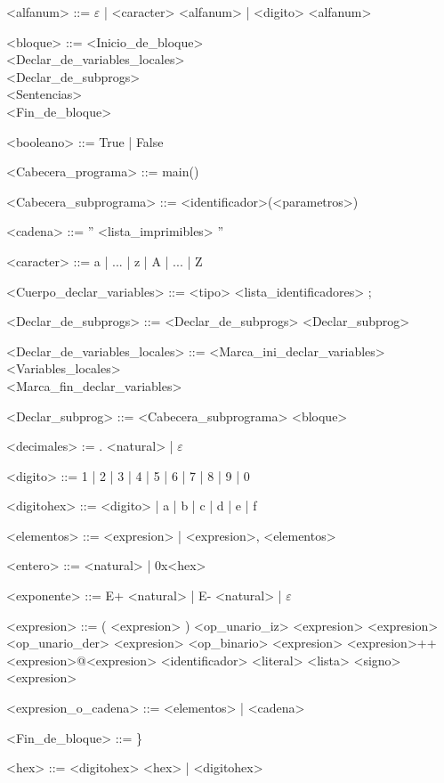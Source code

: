 \setlength{\grammarparsep}{4pt plus 1pt minus 1pt}

\begin{grammar}

<alfanum> ::= $\varepsilon$ | <caracter> <alfanum> | <digito> <alfanum>

<bloque> ::= <Inicio_de_bloque> \\
 <Declar_de_variables_locales> \\
 <Declar_de_subprogs> \\
 <Sentencias> \\
 <Fin_de_bloque>

<booleano> ::= True | False

<Cabecera_programa> ::= main()

<Cabecera_subprograma> ::= <identificador>(<parametros>)

<cadena> ::= '' <lista_imprimibles> ''

<caracter> ::= a | ... | z | A | ... | Z

<Cuerpo_declar_variables> ::= <tipo> <lista_identificadores> ;

<Declar_de_subprogs> ::= <Declar_de_subprogs> <Declar_subprog>

<Declar_de_variables_locales> ::= <Marca_ini_declar_variables> \\
<Variables_locales> \\
<Marca_fin_declar_variables>

<Declar_subprog> ::= <Cabecera_subprograma> <bloque>

<decimales> := . <natural> | $\varepsilon$

<digito> ::= 1 | 2 | 3 | 4 | 5 | 6 | 7 | 8 | 9 | 0

<digitohex> ::= <digito> | a | b | c | d | e | f

<elementos> ::= <expresion> | <expresion>, <elementos>

<entero> ::= <natural> | 0x<hex>

<exponente> ::= E+ <natural> | E- <natural> | $\varepsilon$

<expresion> ::= ( <expresion> )
\alt <op_unario_iz> <expresion>
\alt <expresion> <op_unario_der>
\alt <expresion> <op_binario> <expresion>
\alt <expresion>++<expresion>@<expresion>
\alt <identificador>
\alt <literal>
\alt <lista>
\alt <signo> <expresion>

<expresion_o_cadena> ::= <elementos> | <cadena>

<Fin_de_bloque> ::= \}

<hex> ::= <digitohex> <hex> | <digitohex>


\end{grammar}

